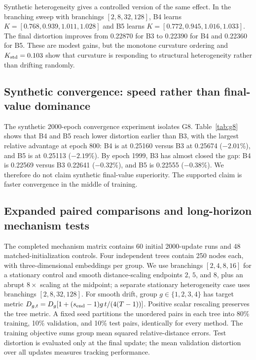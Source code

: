 Synthetic heterogeneity gives a controlled version of the same effect. In the branching sweep with branchings $[2,8,32,128]$, B4 learns $K=[0.768,0.939,1.011,1.028]$ and B5 learns $K=[0.772,0.945,1.016,1.033]$. The final distortion improves from 0.22870 for B3 to 0.22390 for B4 and 0.22360 for B5. These are modest gains, but the monotone curvature ordering and $K_{\mathrm{std}}=0.103$ show that curvature is responding to structural heterogeneity rather than drifting randomly.



\subsection{Synthetic convergence: speed rather than final-value dominance}

The synthetic 2000-epoch convergence experiment isolates G8. Table~\ref{tab:g8} shows that B4 and B5 reach lower distortion earlier than B3, with the largest relative advantage at epoch 800: B4 is at 0.25160 versus B3 at 0.25674 ($-2.01\%$), and B5 is at 0.25113 ($-2.19\%$). By epoch 1999, B3 has almost closed the gap: B4 is 0.22569 versus B3 0.22641 ($-0.32\%$), and B5 is 0.22555 ($-0.38\%$). We therefore do not claim synthetic final-value superiority. The supported claim is faster convergence in the middle of training.








\subsection{Expanded paired comparisons and long-horizon mechanism tests}
The completed mechanism matrix contains 60 initial 2000-update runs and 48 matched-initialization controls. Four independent trees contain 250 nodes each, with three-dimensional embeddings per group. We use branchings $[2,4,8,16]$ for a stationary control and smooth distance-scaling endpoints $2$, $5$, and $8$, plus an abrupt $8\times$ scaling at the midpoint; a separate stationary heterogeneity case uses branchings $[2,8,32,128]$. For smooth drift, group $g\in\{1,2,3,4\}$ has target metric $D_{g,t}=D_g[1+(s_{\rm end}-1)g\,t/(4(T-1))]$. Positive scalar rescaling preserves the tree metric. A fixed seed partitions the unordered pairs in each tree into 80\% training, 10\% validation, and 10\% test pairs, identically for every method. The training objective sums group mean squared relative-distance errors. Test distortion is evaluated only at the final update; the mean validation distortion over all updates measures tracking performance.

